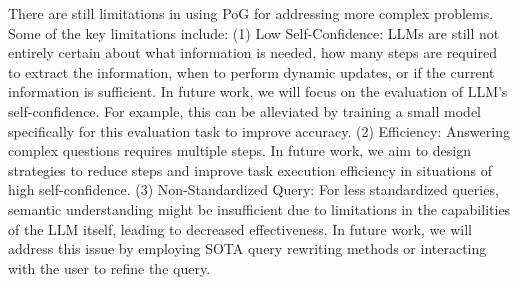 \documentclass{article}
\begin{document}
There are still limitations in using PoG for addressing more complex problems. Some of the key limitations include: (1)
Low Self-Confidence: LLMs are still not entirely certain about what information is needed, how many steps are required to extract the information, when to perform dynamic updates, or if the current information is sufficient. In future work, we will focus on the evaluation of LLM's self-confidence. For example, this can be alleviated by training a small model specifically for this evaluation task to improve accuracy.
(2) Efficiency: Answering complex questions requires multiple steps. In future work, we aim to design strategies to reduce steps and improve task execution efficiency in situations of high self-confidence.
(3) Non-Standardized Query: For less standardized queries, semantic understanding might be insufficient due to limitations in the capabilities of the LLM itself, leading to decreased effectiveness. In future work, we will address this issue by employing SOTA query rewriting methods or interacting with the user to refine the query.
\end{document}
